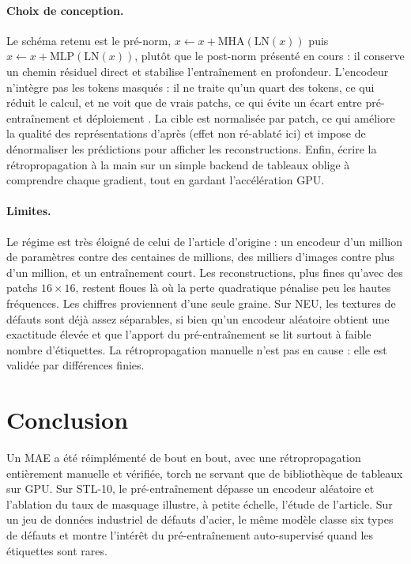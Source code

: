 \documentclass[twocolumn,10pt,a4paper]{article}
\begin{document}
\paragraph{Choix de conception.}
Le schéma retenu est le pré-norm, $x \leftarrow x + \mathrm{MHA}(\mathrm{LN}(x))$ puis
$x \leftarrow x + \mathrm{MLP}(\mathrm{LN}(x))$, plutôt que le post-norm présenté en cours : il
conserve un chemin résiduel direct et stabilise l'entraînement en profondeur. L'encodeur n'intègre
pas les tokens masqués : il ne traite qu'un quart des tokens, ce qui réduit le calcul, et ne voit
que de vrais patchs, ce qui évite un écart entre pré-entraînement et déploiement \cite{he2022mae}.
La cible est normalisée par patch, ce qui améliore la qualité des représentations d'après
\cite{he2022mae} (effet non ré-ablaté ici) et impose de dénormaliser les prédictions pour afficher
les reconstructions. Enfin, écrire la rétropropagation à la main sur un simple backend de tableaux
oblige à comprendre chaque gradient, tout en gardant l'accélération GPU.

\paragraph{Limites.}
Le régime est très éloigné de celui de l'article d'origine : un encodeur d'un million de paramètres
contre des centaines de millions, des milliers d'images contre plus d'un million, et un entraînement
court. Les reconstructions, plus fines qu'avec des patchs $16\times 16$, restent floues là où la
perte quadratique pénalise peu les hautes fréquences. Les chiffres proviennent d'une seule graine.
Sur NEU, les textures de défauts sont déjà assez séparables, si bien qu'un encodeur aléatoire obtient
une exactitude élevée et que l'apport du pré-entraînement se lit surtout à faible nombre
d'étiquettes. La rétropropagation manuelle n'est pas en cause : elle est validée par différences
finies.

\section{Conclusion}

Un MAE a été réimplémenté de bout en bout, avec une rétropropagation entièrement manuelle et
vérifiée, torch ne servant que de bibliothèque de tableaux sur GPU. Sur STL-10, le pré-entraînement
dépasse un encodeur aléatoire et l'ablation du taux de masquage illustre, à petite échelle, l'étude
de l'article. Sur un jeu de données industriel de défauts d'acier, le même modèle classe six types
de défauts et montre l'intérêt du pré-entraînement auto-supervisé quand les étiquettes sont rares.
\end{document}
